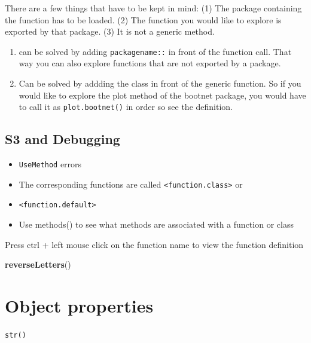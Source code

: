 \documentclass[]{book}
\newenvironment{Shaded}{\begin{snugshade}}{\end{snugshade}}
\newcommand{\KeywordTok}[1]{\textcolor[rgb]{0.13,0.29,0.53}{\textbf{#1}}}
\newcommand{\NormalTok}[1]{#1}
\providecommand{\tightlist}{%
  \setlength{\itemsep}{0pt}\setlength{\parskip}{0pt}}
\begin{document}
There are a few things that have to be kept in mind:
(1) The package containing the function has to be loaded.
(2) The function you would like to explore is exported by that package.
(3) It is not a generic method.

\begin{enumerate}
\def\labelenumi{(\arabic{enumi})}
\setcounter{enumi}{1}
\item
  can be solved by adding \texttt{packagename::} in front of the function call.
  That way you can also explore functions that are not exported by a package.
\item
  Can be solved by addding the class in front of the generic function.
  So if you would like to explore the plot method of the bootnet package,
  you would have to call it as \texttt{plot.bootnet()} in order so see the definition.
\end{enumerate}

\hypertarget{s3-and-debugging}{%
\section{S3 and Debugging}\label{s3-and-debugging}}

\begin{itemize}
\tightlist
\item
  \texttt{UseMethod} errors
\item
  The corresponding functions are called \texttt{\textless{}function.class\textgreater{}} or
\item
  \texttt{\textless{}function.default\textgreater{}}
\item
  Use methods() to see what methods are associated with a function or class
\end{itemize}

Press ctrl + left mouse click on the function name to view the function definition

\begin{Shaded}
\begin{Highlighting}[]
\KeywordTok{reverseLetters}\NormalTok{()}
\end{Highlighting}
\end{Shaded}

\hypertarget{object-properties}{%
\chapter{Object properties}\label{object-properties}}

\texttt{str()}
\end{document}
